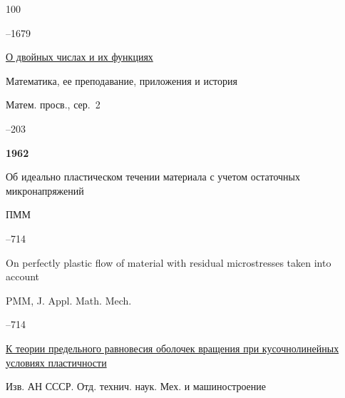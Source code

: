 \begin{thebibliography}{100}

--1679 






\paper \href{http://mi.mathnet.ru/mp689}{О двойных числах и их функциях}

\inbook Математика, ее преподавание, приложения и история

\serial Матем. просв., сер.~2



--203




\item[] \centerline{\bf 1962}






\paper Об идеально пластическом течении материала с учетом остаточных микронапряжений 

\jour ПММ 




–714

\transl

\paper On perfectly plastic flow of material with residual microstresses taken into account

\jour PMM, J. Appl. Math. Mech. 


--714 











\paper \href{https://zbmath.org/?q=an:0133.18503}{К теории предельного равновесия оболочек вращения при кусочнолинейных условиях пластичности}

\jour Изв. АН СССР. Отд. технич. наук. Мех. и машиностроение



\end{thebibliography}
